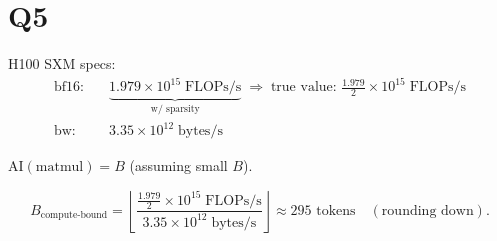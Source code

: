 \documentclass[11pt]{article}
\newcommand{\flopss}{\text{FLOPs/s}}
\newcommand{\bytesps}{\text{bytes/s}}
\newcommand{\AI}{\mathrm{AI}}
\begin{document}
\section*{Q5}

H100 SXM specs:
\begin{align*}
\text{bf16:} &\quad \underbrace{1.979 \times 10^{15} \; \flopss}_{\text{w/ sparsity}}
\;\Longrightarrow\; \text{true value: } \frac{1.979}{2} \times 10^{15} \; \flopss \\
\text{bw:} &\quad 3.35 \times 10^{12} \; \bytesps
\end{align*}

$\AI(\text{matmul}) = B$ \quad (assuming small $B$).

\[
B_{\text{compute-bound}}
= \left\lfloor \frac{\frac{1.979}{2} \times 10^{15} \; \flopss}{3.35 \times 10^{12} \; \bytesps} \right\rfloor
\approx 295 \text{ tokens} \quad (\text{rounding down}).
\]
\end{document}
